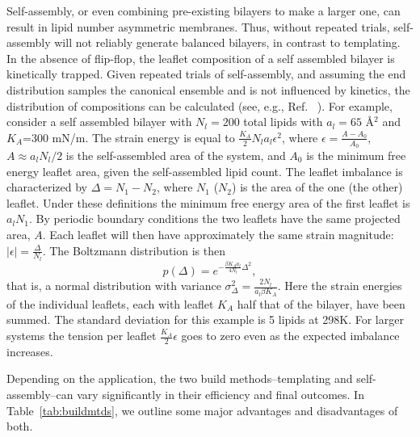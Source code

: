 \documentclass[9pt,bestpractices,pubversion]{livecoms}
\begin{document}
Self-assembly, or even combining pre-existing bilayers to make a larger one, can result in lipid number asymmetric membranes.
Thus, without repeated trials, self-assembly will not reliably generate balanced bilayers, in contrast to templating.
In the absence of flip-flop, the leaflet composition of a self assembled bilayer is kinetically trapped.
Given repeated trials of self-assembly, and assuming the end distribution samples the canonical ensemble and is not influenced by kinetics, the distribution of compositions can be calculated (see, e.g., Ref. ~\cite{Park2015a}).
For example, consider a self assembled bilayer with $N_l=200$ total lipids with $a_l=65$ \AA$^2$ and $K_A$=300 mN/m.
The strain energy is equal to $\frac{K_A}{2} N_l a_l \epsilon^2$, where $\epsilon=\frac{A-A_0}{A_0}$, $A \approx a_l N_l / 2$ is the self-assembled area of the system, and $A_0$ is the minimum free energy leaflet area, given the self-assembled lipid count. 
The leaflet imbalance is characterized by $\Delta = N_\textrm{1} - N_\textrm{2}$, where $N_{1}$ ($N_2$) is the area of the one (the other) leaflet.
Under these definitions the minimum free energy area of the first leaflet is $a_l N_1$.
By periodic boundary conditions the two leaflets have the same projected area, $A$.
Each leaflet will then have approximately the same strain magnitude: $|\epsilon| = \frac{\Delta}{N_l}$.   
The Boltzmann distribution is then
\begin{equation}
p(\Delta) = e^{-\frac{\beta K_A a_l }{4 N_l} \Delta^2}, 
\end{equation}
that is, a normal distribution with variance $\sigma_\Delta^2 = \frac{2 N_l}{a_l \beta K_A}$.
Here the strain energies of the individual leaflets, each with leaflet $K_A$ half that of the bilayer, have been summed.
The standard deviation for this example is 5 lipids at 298K. 
For larger systems the tension per leaflet $\frac{K_A}{2} \epsilon$ goes to zero even as the expected imbalance increases.

Depending on the application, the two build methods--templating and self-assembly--can vary significantly in their efficiency and final outcomes.
In Table~\ref{tab:buildmtds}, we outline some major advantages and disadvantages of both.
\end{document}
